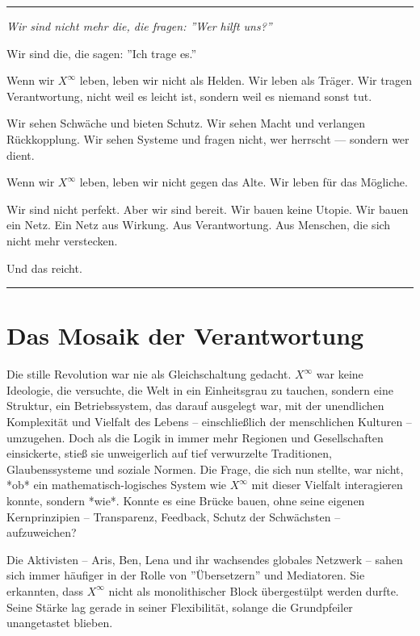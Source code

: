 \documentclass[12pt, ngerman, parskip=full]{scrartcl} %
\begin{document}
\noindent\rule{\linewidth}{0.4pt}
{\itshape Wir sind nicht mehr die, die fragen: ''Wer hilft uns?''

Wir sind die, die sagen: ''Ich trage es.''

Wenn wir $X^{\infty}$ leben, leben wir nicht als Helden. Wir leben als Träger.  
Wir tragen Verantwortung, nicht weil es leicht ist, sondern weil es niemand sonst tut.

Wir sehen Schwäche und bieten Schutz.  
Wir sehen Macht und verlangen Rückkopplung.  
Wir sehen Systeme und fragen nicht, wer herrscht — sondern wer dient.

Wenn wir $X^{\infty}$ leben, leben wir nicht gegen das Alte. Wir leben für das Mögliche.

Wir sind nicht perfekt. Aber wir sind bereit.  
Wir bauen keine Utopie. Wir bauen ein Netz.  
Ein Netz aus Wirkung. Aus Verantwortung. Aus Menschen, die sich nicht mehr verstecken.

Und das reicht.

}



\noindent\rule{\linewidth}{0.4pt}




\section{Das Mosaik der Verantwortung}
Die stille Revolution war nie als Gleichschaltung gedacht. $X^{\infty}$ war keine Ideologie, die versuchte, die Welt in ein Einheitsgrau zu tauchen, sondern eine Struktur, ein Betriebssystem, das darauf ausgelegt war, mit der unendlichen Komplexität und Vielfalt des Lebens – einschließlich der menschlichen Kulturen – umzugehen. Doch als die Logik in immer mehr Regionen und Gesellschaften einsickerte, stieß sie unweigerlich auf tief verwurzelte Traditionen, Glaubenssysteme und soziale Normen. Die Frage, die sich nun stellte, war nicht, *ob* ein mathematisch-logisches System wie $X^{\infty}$ mit dieser Vielfalt interagieren konnte, sondern *wie*. Konnte es eine Brücke bauen, ohne seine eigenen Kernprinzipien – Transparenz, Feedback, Schutz der Schwächsten – aufzuweichen?

Die Aktivisten – Aris, Ben, Lena und ihr wachsendes globales Netzwerk – sahen sich immer häufiger in der Rolle von ''Übersetzern'' und Mediatoren. Sie erkannten, dass $X^{\infty}$ nicht als monolithischer Block übergestülpt werden durfte. Seine Stärke lag gerade in seiner Flexibilität, solange die Grundpfeiler unangetastet blieben.
\end{document}
